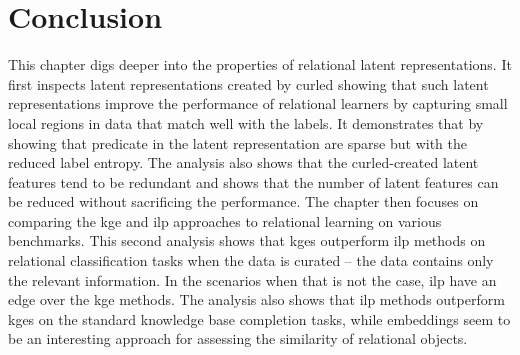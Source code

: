 %
%



\section{Conclusion}


This chapter digs deeper into the properties of relational latent representations.
It first inspects latent representations created by \gls{curled} showing that such latent representations improve the performance of relational learners by capturing small local regions in data that match well with the labels.
It demonstrates that by showing that predicate in the latent representation are sparse but with the reduced label entropy.
The analysis also shows that the \gls{curled}-created latent features tend to be redundant and shows that the number of latent features can be reduced without sacrificing the performance.
The chapter then focuses on comparing the \gls{kge} and \gls{ilp} approaches to relational learning on various benchmarks.
This second analysis shows that \gls{kge}s outperform \gls{ilp} methods on relational classification tasks when the data is curated -- the data contains only the relevant information.
In the scenarios when that is not the case, \gls{ilp} have an edge over the \gls{kge} methods.
The analysis also shows that \gls{ilp} methods outperform \gls{kge}s on the standard knowledge base completion tasks, while embeddings seem to be an interesting approach for assessing the similarity of relational objects. 



\cleardoublepage

